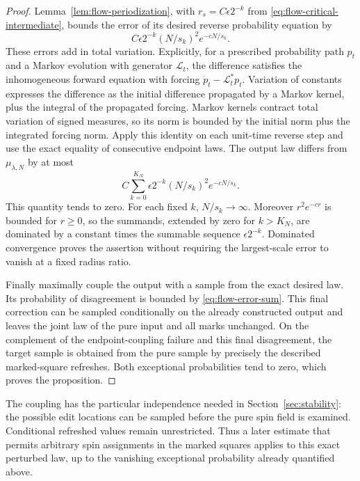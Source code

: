 \begin{proof}
Lemma~\ref{lem:flow-periodization}, with
\(r_s=C\epsilon2^{-k}\) from
\eqref{eq:flow-critical-intermediate}, bounds the error of its desired
reverse probability equation by
\[
 C\epsilon2^{-k}(N/s_k)^2e^{-cN/s_k}.
\]
These errors add in total variation.  Explicitly, for a prescribed
probability path \(p_t\) and a Markov evolution with generator
\(\mathcal L_t\), the difference satisfies the inhomogeneous forward
equation with forcing \(\dot p_t-\mathcal L_t^*p_t\).  Variation of
constants expresses the difference as the initial difference propagated
by a Markov kernel, plus the integral of the propagated forcing.
Markov kernels contract total variation of signed measures, so its norm
is bounded by the initial norm plus the integrated forcing norm.  Apply
this identity on each unit-time reverse step and use the exact equality
of consecutive endpoint laws.  The output law differs from
\(\mu_{\lambda,N}\) by at most
\begin{equation}\label{eq:flow-error-sum}
 C\sum_{k=0}^{K_N}\epsilon2^{-k}(N/s_k)^2e^{-cN/s_k}.
\end{equation}
This quantity tends to zero.  For each fixed \(k\), \(N/s_k\to\infty\).
Moreover \(r^2e^{-cr}\) is bounded for \(r\ge0\), so the summands,
extended by zero for \(k>K_N\), are dominated by a constant times the
summable sequence \(\epsilon2^{-k}\).  Dominated convergence proves
the assertion without requiring the largest-scale error to vanish at a
fixed radius ratio.

Finally maximally couple the output with a sample from the exact desired
law.  Its probability of disagreement is bounded by
\eqref{eq:flow-error-sum}.  This final correction can be sampled
conditionally on the already constructed output and leaves the joint law
of the pure input and all marks unchanged.  On the complement of the
endpoint-coupling failure and this final disagreement, the target sample
is obtained from the pure sample by precisely the described marked-square
refreshes.  Both exceptional probabilities tend to zero, which proves
the proposition.
\end{proof}

The coupling has the particular independence needed in
Section~\ref{sec:stability}: the possible edit locations can be sampled
before the pure spin field is examined.  Conditional refreshed values
remain unrestricted.  Thus a later estimate that permits arbitrary spin
assignments in the marked squares applies to this exact perturbed law,
up to the vanishing exceptional probability already quantified above.
